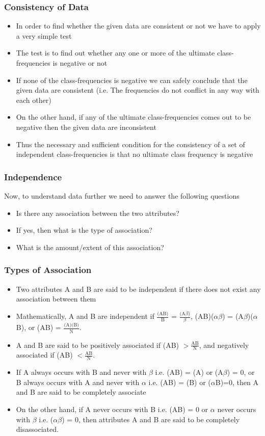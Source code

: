\documentclass[
10pt, %
a4paper, %
]{report}
\begin{document}
\subsubsection{Consistency of Data}
\begin{itemize}
\item In order to find whether the given data are consistent or not we have to apply a very simple test
\item The test is to find out whether any one or more of the ultimate
class-frequencies is negative or not
\item If none of the class-frequencies is negative we can safely conclude that the given data are consistent (i.e. The frequencies do not conflict in any way with each other)
\item On the other hand, if any of the ultimate class-frequencies comes out to be negative then the given data are inconsistent
\item Thus the necessary and sufficient condition for the consistency of a set of independent class-frequencies is that no ultimate class frequency is negative
\end{itemize}

\subsubsection{Independence}
Now, to understand data further we need to answer the following questions
\begin{itemize}
\item Is there any association between the two attributes?
\item If yes, then what is the type of association?
\item What is the amount/extent of this association?
\end{itemize}

\subsubsection{Types of Association}
\begin{itemize}
\item Two attributes A and B are said to be independent if there does not exist any association between them
\item Mathematically, A and B are independent if \(\frac{\text{(AB)}}{\text{B}}\) = \(\frac{\text{(A}\beta)}{\beta}\), (AB)(\(\alpha\beta\)) = (A\(\beta\))(\(\alpha\)B), or (AB) = \(\frac{\text{(A)(B)}}{\text{N}}\).
\item A and B are said to be positively associated if (AB) \(> \frac{\text{AB}}{\text{N}}\), and negatively associated if (AB) \(< \frac{\text{AB}}{\text{N}}\).
\item If A always occurs with B and never with \(\beta\) i.e. (AB) = (A) or (A\(\beta\)) = 0, or B always occurs with A and never with \(\alpha\) i.e. (AB) = (B) or (\(\alpha\)B)=0, then A and B are said to be completely associate
\item On the other hand, if A never occurs with B i.e. (AB) = 0 or \(\alpha\) never occurs with \(\beta\) i.e. (\(\alpha\beta\)) = 0, then attributes A and B are said to be completely disassociated.
\end{itemize}
\end{document}
